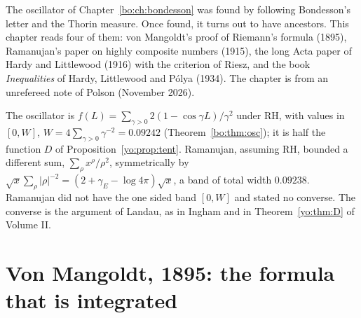\label{ch:classics}

The oscillator of Chapter~\ref{bo:ch:bondesson} was found by following Bondesson's letter and the Thorin measure. Once found, it turns out to have ancestors. This chapter reads four of them: von Mangoldt's proof of Riemann's formula (1895), Ramanujan's paper on highly composite numbers (1915), the long Acta paper of Hardy and Littlewood (1916) with the criterion of Riesz, and the book \emph{Inequalities} of Hardy, Littlewood and P\'olya (1934). The chapter is from an unrefereed note of Polson (November 2026).

The oscillator is $f(L)=\sum_{\gamma>0}2(1-\cos\gamma L)/\gamma^2$ under RH, with values in $[0,W]$, $W=4\sum_{\gamma>0}\gamma^{-2}=0.09242$ (Theorem~\ref{bo:thm:osc}); it is half the function $D$ of Proposition~\ref{yo:prop:tent}. Ramanujan, assuming RH, bounded a different sum, $\sum_\rho x^\rho/\rho^2$, symmetrically by $\sqrt x\sum_\rho|\rho|^{-2}=(2+\gamma_E-\log4\pi)\sqrt x$, a band of total width $0.09238$. Ramanujan did not have the one sided band $[0,W]$ and stated no converse. The converse is the argument of Landau, as in Ingham \cite{Ingham32} and in Theorem~\ref{yo:thm:D} of Volume II.

\section{Von Mangoldt, 1895: the formula that is integrated}\label{cl:sec:vm}

